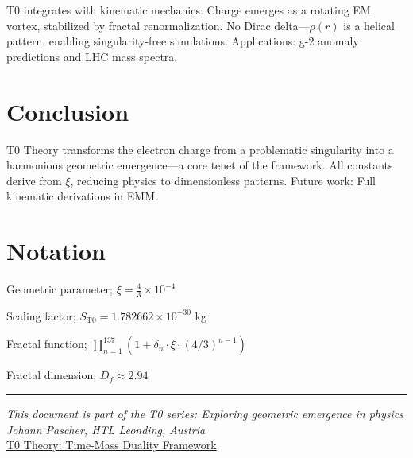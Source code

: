 \documentclass[12pt,a4paper]{article}
\begin{document}
	T0 integrates with kinematic mechanics: Charge emerges as a rotating EM vortex, stabilized by fractal renormalization. No Dirac delta—$\rho(r)$ is a helical pattern, enabling singularity-free simulations. Applications: g-2 anomaly predictions and LHC mass spectra.
	
	\section{Conclusion}
	
	T0 Theory transforms the electron charge from a problematic singularity into a harmonious geometric emergence—a core tenet of the framework. All constants derive from $\xi$, reducing physics to dimensionless patterns. Future work: Full kinematic derivations in EMM.
	
	\appendix
	\section{Notation}
	\begin{description}[leftmargin=1cm]
		\item[$\xi$] Geometric parameter; $\xi = \frac{4}{3} \times 10^{-4}$
		\item[$S_{\mathrm{T0}}$] Scaling factor; $S_{\mathrm{T0}} = 1.782662 \times 10^{-30}$ kg
		\item[$f_{\text{fractal}}$] Fractal function; $\prod_{n=1}^{137} (1 + \delta_n \cdot \xi \cdot (4/3)^{n-1})$
		\item[$D_f$] Fractal dimension; $D_f \approx 2.94$
	\end{description}
	
	\begin{center}
		\hrule
		\vspace{0.5cm}
		\textit{This document is part of the T0 series: Exploring geometric emergence in physics}\\
		\textit{Johann Pascher, HTL Leonding, Austria}\\
		\vspace{0.3cm}
		\href{https://github.com/jpascher/T0-Time-Mass-Duality}{T0 Theory: Time-Mass Duality Framework}
		\vspace{0.3cm}
	\end{center}
	
\end{document}
